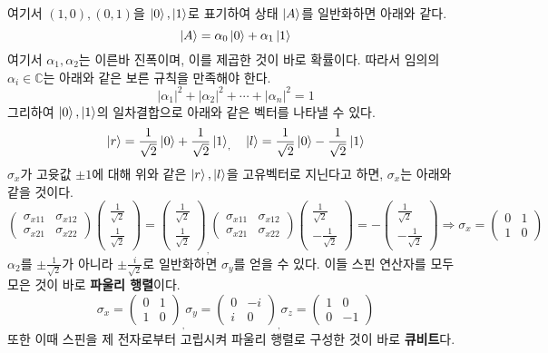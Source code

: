 \documentclass[a4paper,atbegshi,chapter,]{oblivoir}
\begin{document}
여기서 $(1,0),(0,1)$을 $\ket{0},\ket{1}$로 표기하여 상태 $\ket{A}$를 일반화하면
아래와 같다.
\[
  \ket{A} = \alpha_0\ket{0}+\alpha_1\ket{1}
\]
여기서 $\alpha_1,\alpha_2$는 이른바 진폭이며, 이를 제곱한 것이 바로 확률이다. 따라서
임의의 $\alpha_i\in\mathbb{C}$는 아래와 같은 보른 규칙을 만족해야 한다. 
\[
  |\alpha_1|^2+|\alpha_2|^2+\cdots+|\alpha_n|^2=1
\]
그리하여 $\ket{0},\ket{1}$의 일차결합으로 아래와 같은 벡터를 나타낼 수 있다.
\[
  \ket{r} = \frac{1}{\sqrt{2}}\ket{0}+\frac{1}{\sqrt2}\ket{1}_,\quad
  \ket{l} = \frac{1}{\sqrt2}\ket{0}-\frac{1}{\sqrt2}\ket{1}
\]
$\sigma_x$가 고윳값 $\pm1$에 대해 위와 같은 $\ket{r},\ket{l}$을 고유벡터로 지닌다고 하면,
$\sigma_x$는 아래와 같을 것이다.
\[
  \begin{pmatrix}
    \sigma_{x11}&\sigma_{x12}\\\sigma_{x21}&\sigma_{x22}
  \end{pmatrix}
  \begin{pmatrix}\frac{1}{\sqrt2}\\\frac{1}{\sqrt2}\end{pmatrix}
  =\begin{pmatrix}\frac{1}{\sqrt2}\\\frac{1}{\sqrt2}\end{pmatrix}_,
  \begin{pmatrix}
    \sigma_{x11}&\sigma_{x12}\\\sigma_{x21}&\sigma_{x22}
  \end{pmatrix}
  \begin{pmatrix}\frac{1}{\sqrt2}\\-\frac{1}{\sqrt2}\end{pmatrix}
  =-\begin{pmatrix}\frac{1}{\sqrt2}\\-\frac{1}{\sqrt2}\end{pmatrix}
  \Longrightarrow \sigma_x = \begin{pmatrix}0&1\\1&0\end{pmatrix}
\]
$\alpha_2$를 $\pm\frac{1}{\sqrt2}$가 아니라 $\pm\frac{i}{\sqrt2}$로 일반화하면
$\sigma_y$를 얻을 수 있다. 이들 스핀 연산자를 모두 모은 것이 바로 \textbf{파울리 행렬}이다.
\[
  \sigma_x = \begin{pmatrix}0&1\\1&0\end{pmatrix}_,
  \sigma_y = \begin{pmatrix}0&-i\\i&0\end{pmatrix}_,
  \sigma_z=\begin{pmatrix}1&0\\0&-1\end{pmatrix}
\]
또한 이때 스핀을 제 전자로부터 고립시켜 파울리 행렬로 구성한 것이 바로 \textbf{큐비트}다.
\end{document}
